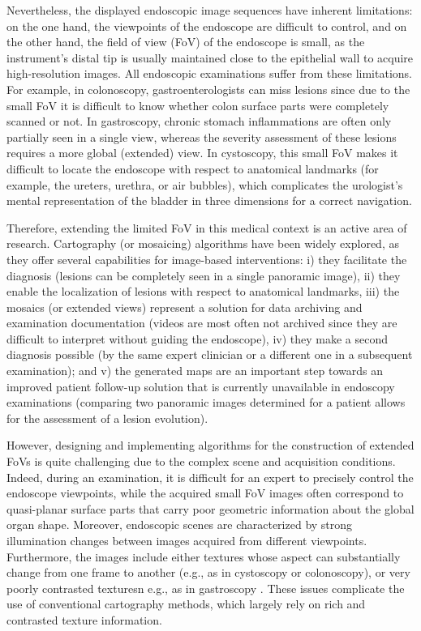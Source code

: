 \documentclass[a4paper,fleqn]{cas-dc}
\begin{document}
Nevertheless, the displayed endoscopic image sequences have inherent limitations: on the one hand, the viewpoints of the endoscope are difficult to control, and on the other hand, the field of view (FoV) of the endoscope is small, as the instrument's distal tip is usually maintained close to the epithelial wall to acquire high-resolution images. All endoscopic examinations suffer from these limitations. For example, in colonoscopy, gastroenterologists can miss lesions since due to the small FoV it is difficult to know whether colon surface parts were completely scanned or not. In gastroscopy,  chronic stomach inflammations are often only partially seen in a single view, whereas the severity assessment of these lesions requires a more global (extended) view. In cystoscopy, this small FoV makes it difficult to locate the endoscope with respect to anatomical landmarks (for example, the ureters, urethra, or air bubbles), which complicates the urologist’s mental representation of the bladder in three dimensions for a correct navigation.  

Therefore, extending the limited FoV  in this medical context is an active area of research. Cartography (or mosaicing) algorithms have been widely explored, as they offer several capabilities for image-based interventions: i) they facilitate the diagnosis (lesions can be completely seen in a single panoramic image), ii) they enable the localization of lesions with respect to anatomical landmarks, iii) the mosaics (or extended views) represent a solution for data archiving and examination documentation (videos are most often not archived since they are difficult to interpret without guiding the endoscope), iv) they make a second diagnosis possible (by the same expert clinician or a different one in a subsequent examination); and v) the generated maps are an important step towards an improved patient follow-up solution that is currently unavailable in endoscopy examinations (comparing two panoramic images determined for a patient allows for the assessment of a lesion evolution). 

However, designing and implementing algorithms for the construction of extended FoVs  is quite challenging due to the complex scene and acquisition conditions. Indeed, during an examination, it is difficult for an expert to precisely control the endoscope viewpoints, while  the acquired small FoV images often correspond to quasi-planar surface parts that carry poor geometric information about the global organ shape. Moreover, endoscopic scenes are characterized by strong illumination changes \citep{Weibel_ICPR_2012} between images acquired from different viewpoints. Furthermore, the images include either textures whose aspect can substantially change from one frame to another (e.g., as in cystoscopy or colonoscopy), or very poorly contrasted texturesn e.g., as in gastroscopy \citep{Phan_GRETSI_2019}. These issues complicate the use of conventional cartography methods, which largely rely on rich and contrasted texture information.
\end{document}
